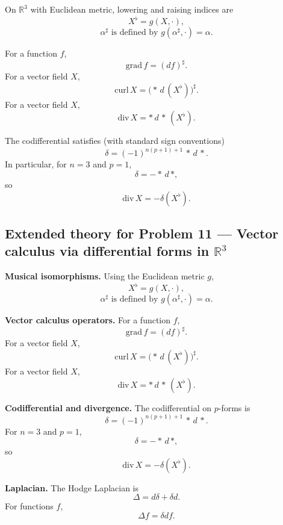 \documentclass[12pt,a4paper]{article}
\theoremstyle{plain}
\theoremstyle{definition}      %
\begin{document}
On $\mathbb{R}^3$ with Euclidean metric, lowering and raising indices are
\[
X^\flat=g(X,\cdot),
\]
\[
\alpha^\sharp \text{ is defined by } g(\alpha^\sharp,\cdot)=\alpha.
\]

For a function $f$,
\[
\mathrm{grad}\,f=(df)^\sharp.
\]
For a vector field $X$,
\[
\mathrm{curl}\,X=\bigl(*\,d\,(X^\flat)\bigr)^\sharp.
\]
For a vector field $X$,
\[
\mathrm{div}\,X=*\,d\,*\,(X^\flat).
\]

The codifferential satisfies (with standard sign conventions)
\[
\delta = (-1)^{n(p+1)+1}\,*\,d\,*.
\]
In particular, for $n=3$ and $p=1$,
\[
\delta=-*\,d\,*,
\]
so
\[
\mathrm{div}\,X=-\delta(X^\flat).
\]



\subsection*{Extended theory for Problem 11 — Vector calculus via differential forms in $\mathbb{R}^3$}

\textbf{Musical isomorphisms.}
Using the Euclidean metric $g$,
\[
X^\flat=g(X,\cdot),
\]
\[
\alpha^\sharp \text{ is defined by } g(\alpha^\sharp,\cdot)=\alpha.
\]

\textbf{Vector calculus operators.}
For a function $f$,
\[
\mathrm{grad}\,f=(df)^\sharp.
\]
For a vector field $X$,
\[
\mathrm{curl}\,X=\bigl(*\,d\,(X^\flat)\bigr)^\sharp.
\]
For a vector field $X$,
\[
\mathrm{div}\,X=*\,d\,*\,(X^\flat).
\]

\textbf{Codifferential and divergence.}
The codifferential on $p$-forms is
\[
\delta = (-1)^{n(p+1)+1}\,*\,d\,*.
\]
For $n=3$ and $p=1$,
\[
\delta=-*\,d\,*,
\]
so
\[
\mathrm{div}\,X=-\delta(X^\flat).
\]

\textbf{Laplacian.}
The Hodge Laplacian is
\[
\Delta=d\delta+\delta d.
\]
For functions $f$,
\[
\Delta f=\delta df.
\]




	
\end{document}
